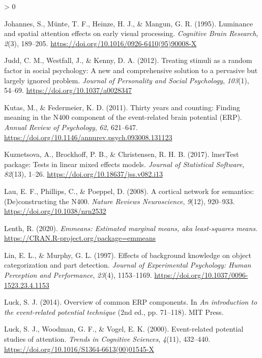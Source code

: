 \documentclass[
  english,
  doc,12pt,twoside,floatsintext]{apa7}
\newlength{\cslhangindent}
\newenvironment{CSLReferences}[2] %
 {%
  \setlength{\parindent}{0pt}
  \ifodd #1 \everypar{\setlength{\hangindent}{\cslhangindent}}\ignorespaces\fi
  \ifnum #2 > 0
  \setlength{\parskip}{#2\baselineskip}
  \fi
 }%
 {}
\begin{document}
\begin{CSLReferences}{1}{0}
\leavevmode\hypertarget{ref-johannes1995}{}%
Johannes, S., Münte, T. F., Heinze, H. J., \& Mangun, G. R. (1995). Luminance and spatial attention effects on early visual processing. \emph{Cognitive Brain Research}, \emph{2}(3), 189--205. \url{https://doi.org/10.1016/0926-6410(95)90008-X}

\leavevmode\hypertarget{ref-judd2012}{}%
Judd, C. M., Westfall, J., \& Kenny, D. A. (2012). Treating stimuli as a random factor in social psychology: A new and comprehensive solution to a pervasive but largely ignored problem. \emph{Journal of Personality and Social Psychology}, \emph{103}(1), 54--69. \url{https://doi.org/10.1037/a0028347}

\leavevmode\hypertarget{ref-kutas2011}{}%
Kutas, M., \& Federmeier, K. D. (2011). Thirty years and counting: Finding meaning in the {N400} component of the event-related brain potential ({ERP}). \emph{Annual Review of Psychology}, \emph{62}, 621--647. \url{https://doi.org/10.1146/annurev.psych.093008.131123}

\leavevmode\hypertarget{ref-R-lmerTest}{}%
Kuznetsova, A., Brockhoff, P. B., \& Christensen, R. H. B. (2017). {lmerTest} package: Tests in linear mixed effects models. \emph{Journal of Statistical Software}, \emph{82}(13), 1--26. \url{https://doi.org/10.18637/jss.v082.i13}

\leavevmode\hypertarget{ref-lau2008}{}%
Lau, E. F., Phillips, C., \& Poeppel, D. (2008). A cortical network for semantics: (De)constructing the {N400}. \emph{Nature Reviews Neuroscience}, \emph{9}(12), 920--933. \url{https://doi.org/10.1038/nrn2532}

\leavevmode\hypertarget{ref-R-emmeans}{}%
Lenth, R. (2020). \emph{Emmeans: Estimated marginal means, aka least-squares means}. \url{https://CRAN.R-project.org/package=emmeans}

\leavevmode\hypertarget{ref-lin1997}{}%
Lin, E. L., \& Murphy, G. L. (1997). Effects of background knowledge on object categorization and part detection. \emph{Journal of Experimental Psychology: Human Perception and Performance}, \emph{23}(4), 1153--1169. \url{https://doi.org/10.1037/0096-1523.23.4.1153}

\leavevmode\hypertarget{ref-luck2014}{}%
Luck, S. J. (2014). Overview of common ERP components. In \emph{An introduction to the event-related potential technique} (2nd ed., pp. 71--118). MIT Press.

\leavevmode\hypertarget{ref-luck2000}{}%
Luck, S. J., Woodman, G. F., \& Vogel, E. K. (2000). Event-related potential studies of attention. \emph{Trends in Cognitive Sciences}, \emph{4}(11), 432--440. \url{https://doi.org/10.1016/S1364-6613(00)01545-X}


\end{CSLReferences}
\end{document}
